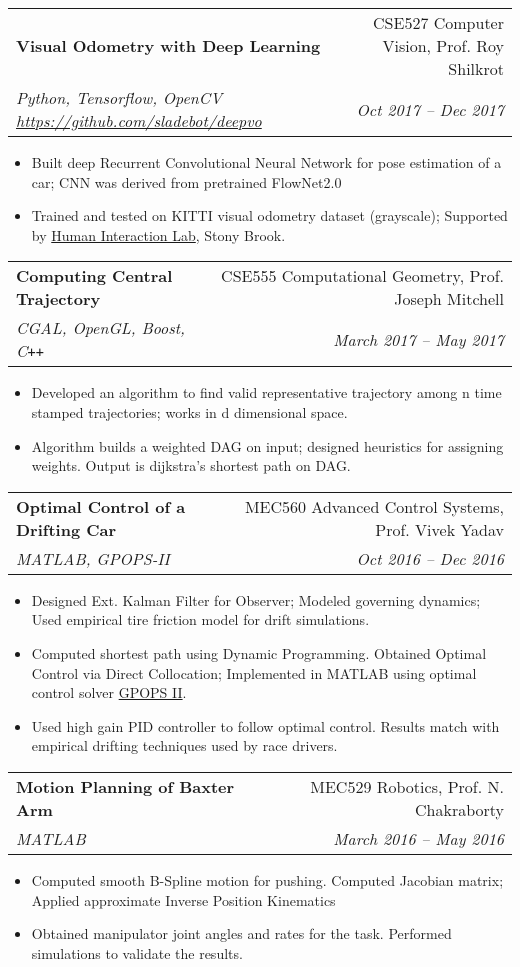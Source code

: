\documentclass[letterpaper,10pt]{article}
\makeatletter
\newcommand{\resumeHeading}[4]{
  \vspace{-1pt}
    \begin{tabular*}{0.97\textwidth}{l@{\extracolsep{\fill}}r}
      \textbf{#1} & #2 \vspace{-2pt}\\ \vspace{1pt}
      \textit{\small#3} & \textit{\small #4} \\
    \end{tabular*}
}
\newcommand{\resumeItemListStart}{
\vspace{-7pt}
\begin{itemize}[leftmargin=14pt]
}
\newcommand{\resumeItemListEnd}{
\vspace{+7pt}
\end{itemize}
}
\newcommand{\resumeItem}[1]{
  \item\small{
      {#1 \vspace{-7pt}
      }
  }
}
\makeatother
\begin{document}
    \resumeHeading{Visual Odometry with Deep Learning}{CSE527 Computer Vision, Prof. Roy Shilkrot} {Python, Tensorflow, OpenCV \href{https://github.com/sladebot/deepvo}{https://github.com/sladebot/deepvo}}{Oct 2017 -- Dec 2017}
    \resumeItemListStart
      \resumeItem{Built deep Recurrent Convolutional Neural Network for pose estimation of a car; CNN was derived from pretrained FlowNet2.0}
      \resumeItem{Trained and tested on KITTI visual odometry dataset (grayscale); Supported by \href{http://hi.cs.stonybrook.edu/}{Human Interaction Lab}, Stony Brook.}
    \resumeItemListEnd


    \resumeHeading{Computing Central Trajectory}{CSE555 Computational Geometry, Prof. Joseph Mitchell}{CGAL, OpenGL, Boost, C\texttt{++}}{March 2017 -- May 2017}
    \resumeItemListStart
      \resumeItem{Developed an algorithm to find valid representative trajectory among n time stamped trajectories; works in d dimensional space.}
      \resumeItem{Algorithm builds a weighted DAG on input; designed heuristics for assigning weights. Output is dijkstra's shortest path on DAG.}
    \resumeItemListEnd
    \vspace{-10pt}

    \resumeHeading{Optimal Control of a Drifting Car}{MEC560 Advanced Control Systems, Prof. Vivek Yadav}{MATLAB, GPOPS-II}{Oct 2016 -- Dec 2016}
    \resumeItemListStart
      \resumeItem{Designed Ext. Kalman Filter for Observer; Modeled governing dynamics; Used empirical tire friction model for drift simulations.}
      \resumeItem{Computed shortest path using Dynamic Programming. Obtained Optimal Control via Direct Collocation; Implemented in MATLAB using optimal control solver \href{http://www.gpops2.com/}{GPOPS II}.}
      \resumeItem{Used high gain PID controller to follow optimal control. Results match with empirical drifting techniques used by race drivers.}
    \resumeItemListEnd

    \vspace{-10pt}
    \resumeHeading{Motion Planning of Baxter Arm}{MEC529 Robotics, Prof. N. Chakraborty}{MATLAB}{March 2016 -- May 2016}
    \resumeItemListStart
      \resumeItem{Computed smooth B-Spline motion for pushing. Computed Jacobian matrix; Applied approximate Inverse Position Kinematics}
      \resumeItem{Obtained manipulator joint angles and rates for the task. Performed simulations to validate the results.}
    \resumeItemListEnd
\end{document}
